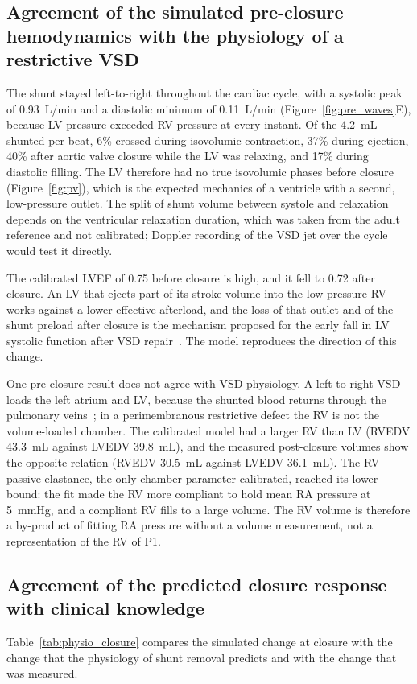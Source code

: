 \documentclass{article}
\begin{document}
\subsection{Agreement of the simulated pre-closure hemodynamics with the physiology of a restrictive VSD}
The shunt stayed left-to-right throughout the cardiac cycle, with a systolic peak of 0.93~L/min and a diastolic minimum of 0.11~L/min (Figure~\ref{fig:pre_waves}E), because LV pressure exceeded RV pressure at every instant. Of the 4.2~mL shunted per beat, 6\% crossed during isovolumic contraction, 37\% during ejection, 40\% after aortic valve closure while the LV was relaxing, and 17\% during diastolic filling. The LV therefore had no true isovolumic phases before closure (Figure~\ref{fig:pv}), which is the expected mechanics of a ventricle with a second, low-pressure outlet. The split of shunt volume between systole and relaxation depends on the ventricular relaxation duration, which was taken from the adult reference and not calibrated; Doppler recording of the VSD jet over the cycle would test it directly.

The calibrated LVEF of 0.75 before closure is high, and it fell to 0.72 after closure. An LV that ejects part of its stroke volume into the low-pressure RV works against a lower effective afterload, and the loss of that outlet and of the shunt preload after closure is the mechanism proposed for the early fall in LV systolic function after VSD repair~\cite{Safa2023}. The model reproduces the direction of this change.

One pre-closure result does not agree with VSD physiology. A left-to-right VSD loads the left atrium and LV, because the shunted blood returns through the pulmonary veins~\cite{Safa2023,Rao2024}; in a perimembranous restrictive defect the RV is not the volume-loaded chamber. The calibrated model had a larger RV than LV (RVEDV 43.3~mL against LVEDV 39.8~mL), and the measured post-closure volumes show the opposite relation (RVEDV 30.5~mL against LVEDV 36.1~mL). The RV passive elastance, the only chamber parameter calibrated, reached its lower bound: the fit made the RV more compliant to hold mean RA pressure at 5~mmHg, and a compliant RV fills to a large volume. The RV volume is therefore a by-product of fitting RA pressure without a volume measurement, not a representation of the RV of P1.

\subsection{Agreement of the predicted closure response with clinical knowledge}
Table~\ref{tab:physio_closure} compares the simulated change at closure with the change that the physiology of shunt removal predicts and with the change that was measured.
\end{document}
